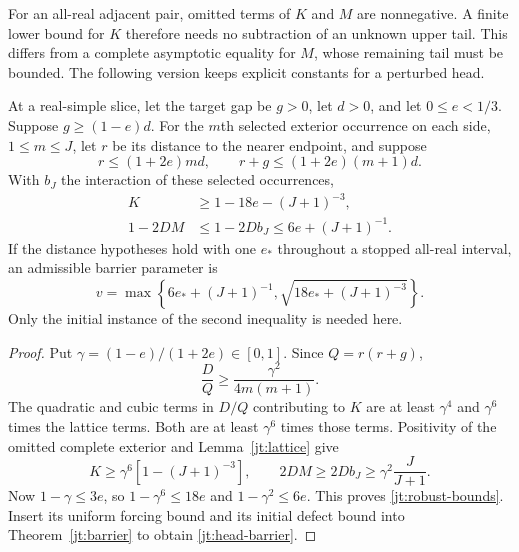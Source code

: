 For an all-real adjacent pair, omitted terms of $K$ and $M$ are
nonnegative. A finite lower bound for $K$ therefore needs no subtraction
of an unknown upper tail. This differs from a complete asymptotic
equality for $M$, whose remaining tail must be bounded. The following
version keeps explicit constants for a perturbed head.

\begin{proposition}
\label{jt:robust-head}
At a real-simple slice, let the target gap be $g>0$, let $d>0$, and
let $0\le e<1/3$. Suppose $g\ge(1-e)d$. For the $m$th selected
exterior occurrence on each side, $1\le m\le J$, let $r$ be its
distance to the nearer endpoint, and suppose
\begin{equation}
 r\le(1+2e)md,\qquad r+g\le(1+2e)(m+1)d.
 \label{jt:head-distances}
\end{equation}
With $b_J$ the interaction of these selected occurrences,
\begin{equation}
 \begin{split}
 K&\ge1-18e-(J+1)^{-3},\\
 1-2DM&\le1-2Db_J\le6e+(J+1)^{-1}.
 \end{split}
 \label{jt:robust-bounds}
\end{equation}
If the distance hypotheses hold with one $e_*$ throughout a stopped
all-real interval, an admissible barrier parameter is
\begin{equation}
 v=\max\left\{6e_*+(J+1)^{-1},
              \sqrt{18e_*+(J+1)^{-3}}\right\}.
 \label{jt:head-barrier}
\end{equation}
Only the initial instance of the second inequality is needed here.
\end{proposition}

\begin{proof}
Put $\gamma=(1-e)/(1+2e)\in[0,1]$. Since $Q=r(r+g)$,
\[
 \frac{D}{Q}\ge\frac{\gamma^2}{4m(m+1)}.
\]
The quadratic and cubic terms in $D/Q$ contributing to $K$ are at
least $\gamma^4$ and $\gamma^6$ times the lattice terms. Both are at
least $\gamma^6$ times those terms. Positivity of the omitted complete
exterior and Lemma~\ref{jt:lattice} give
\[
 K\ge\gamma^6[1-(J+1)^{-3}],\qquad
 2DM\ge2Db_J\ge\gamma^2\frac{J}{J+1}.
\]
Now $1-\gamma\le3e$, so
$1-\gamma^6\le18e$ and $1-\gamma^2\le6e$. This proves
\eqref{jt:robust-bounds}. Insert its uniform forcing bound and its
initial defect bound into Theorem~\ref{jt:barrier} to obtain
\eqref{jt:head-barrier}.
\end{proof}

